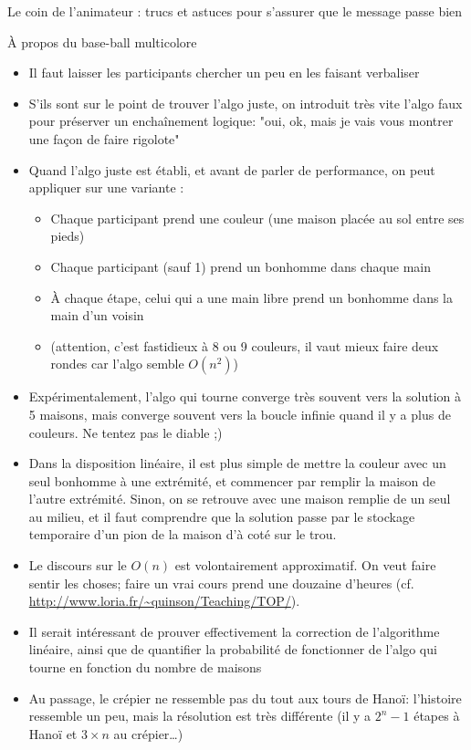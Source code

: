 \begin{frame}{Le coin de l'animateur : trucs et astuces pour s'assurer que le message passe bien}
\begin{block}{À propos du base-ball multicolore}
    \begin{itemize}
    \item Il faut laisser les participants chercher un peu en les faisant verbaliser
    \item S'ils sont sur le point de trouver l'algo juste, on introduit très vite l'algo faux pour préserver un enchaînement logique: "oui, ok, mais je vais vous montrer une façon de faire rigolote"
    \item Quand l'algo juste est établi, et avant de parler de performance, on peut appliquer sur une variante :
      \begin{itemize}
      \item Chaque participant prend une couleur (une maison placée au sol entre ses pieds)
      \item Chaque participant (sauf 1) prend un bonhomme dans chaque main
      \item À chaque étape, celui qui a une main libre prend un bonhomme dans la main d'un voisin
      \item (attention, c'est fastidieux à 8 ou 9 couleurs, il vaut mieux faire deux rondes car l'algo semble $O(n^2)$)
      \end{itemize}
    \item Expérimentalement, l'algo qui tourne converge très souvent vers la solution à 5 maisons, mais converge souvent vers la boucle infinie quand il y a plus de couleurs. Ne tentez pas le diable ;)
    \item Dans la disposition linéaire, il est plus simple de mettre la couleur avec un seul bonhomme à une extrémité, et commencer par remplir la maison de l'autre extrémité. Sinon, on se retrouve avec une maison remplie de un seul au milieu, et il faut comprendre que la solution passe par le stockage temporaire d'un pion de la maison d'à coté sur le trou.
    \item Le discours sur le $O(n)$ est volontairement approximatif. On veut faire sentir les choses; faire un vrai cours prend une douzaine d'heures (cf. \url{http://www.loria.fr/~quinson/Teaching/TOP/}).
    \item Il serait intéressant de prouver effectivement la correction de l'algorithme linéaire, ainsi que de quantifier la probabilité de fonctionner de l'algo qui tourne en fonction du nombre de maisons
    \item Au passage, le crépier ne ressemble pas du tout aux tours de Hanoï: l'histoire ressemble un peu, mais la résolution est très différente (il y a $2^n-1$ étapes à Hanoï et $3\times n$ au crépier\ldots)
    \end{itemize}
  \end{block}
\end{frame}
